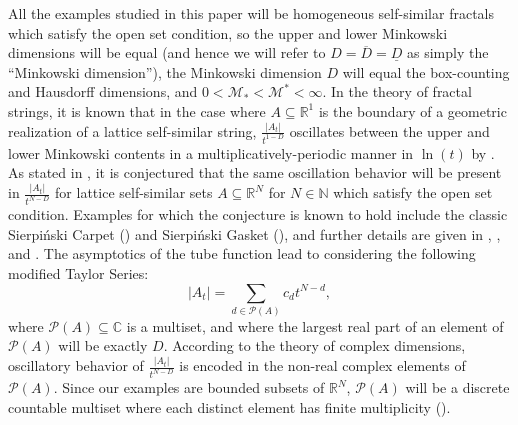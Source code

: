 \documentclass{article}
\theoremstyle{plain}
\numberwithin{equation}{section}
\numberwithin{table}{section}
\numberwithin{figure}{section}
\begin{document}
All the examples studied in this paper will be homogeneous self-similar fractals which satisfy the open set condition, so the upper and lower Minkowski dimensions will be equal (and hence we will refer to $D = \overline{D} = \underline{D}$ as simply the ``Minkowski dimension''), the Minkowski dimension $D$ will equal the box-counting and Hausdorff dimensions, and $0 < \mathscr{M}_* < \mathscr{M}^* < \infty$. In the theory of fractal strings, it is known that in the case where $A \subseteq \mathbb{R}^1$ is the boundary of a geometric realization of a lattice self-similar string, $\frac{|A_t|}{t^{1-D}}$ oscillates between the upper and lower Minkowski contents in a multiplicatively-periodic manner in $\ln(t)$ by \cite[Theorem 8.23]{lapidusbook3}. As stated in \cite[Problem 6.2.35]{lapidusbook}, it is conjectured that the same oscillation behavior will be present in $\frac{|A_t|}{t^{N-D}}$ for lattice self-similar sets $A \subseteq \mathbb{R}^N$ for $N \in \mathbb{N}$ which satisfy the open set condition. Examples for which the conjecture is known to hold include the classic Sierpi\'nski Carpet (\cite[Example 2.3.36]{lapidusbook}) and Sierpi\'nski Gasket (\cite[Equation 1.1.28]{lapidusbook}), and further details are given in \cite{lapidusbook}, \cite{lapidusbook2}, and \cite{lapidusbook3}. The asymptotics of the tube function lead to considering the following modified Taylor Series:
\begin{equation}
|A_t| = \sum_{d \in \mathscr{P}(A)} c_d t^{N-d},
\end{equation}
where $\mathscr{P}(A) \subseteq \mathbb{C}$ is a multiset, and where the largest real part of an element of $\mathscr{P}(A)$ will be exactly $D$. According to the theory of complex dimensions, oscillatory behavior of $\frac{|A_t|}{t^{N-D}}$ is encoded in the non-real complex elements of $\mathscr{P}(A)$. Since our examples are bounded subsets of $\mathbb{R}^N$, $\mathscr{P}(A)$ will be a discrete countable multiset where each distinct element has finite multiplicity (\cite[p. 8]{lapidusbook}). \\
\end{document}
